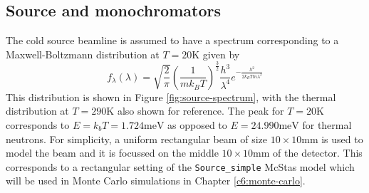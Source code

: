 \documentclass{article}
\begin{document}
\subsection{Source and monochromators}
\label{c3.2}
The cold source beamline is assumed to have a spectrum corresponding to a Maxwell-Boltzmann distribution at $T = 20 \unit{\kelvin}$ given by 
\begin{equation}
	f_\lambda(\lambda) = \sqrt{\frac{2}{\pi}}\left(\frac{1}{mk_BT}\right)^{\frac{3}{2}}\frac{h^3}{\lambda^4}e^{-\frac{h^2}{2k_BTm\lambda^2}} \label{eq:cold-source-spectrum}
\end{equation}
This distribution is shown in Figure \ref{fig:source-spectrum}, with the thermal distribution at $T=290 \unit{\kelvin}$ also shown for reference. The peak for $T=20 \unit{\kelvin}$ corresponds to $E = k_bT = 1.724 \unit{\milli\electronvolt}$ as opposed to $E = 24.990 \unit{\milli\electronvolt}$ for thermal neutrons. For simplicity, a uniform rectangular beam of size $10\times10\unit{\milli\meter}$ is used to model the beam and it is focussed on the middle $10\times10\unit{\milli\meter}$ of the detector. This corresponds to a rectangular setting of the \texttt{Source\_simple} McStas model which will be used in Monte Carlo simulations in Chapter \ref{c6:monte-carlo}.  
\end{document}
